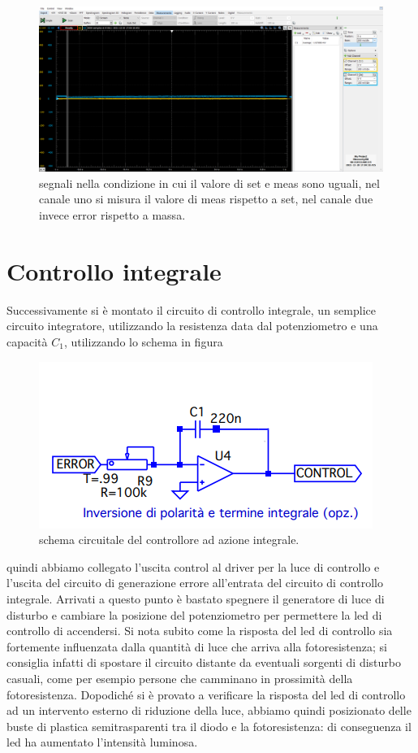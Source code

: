 \documentclass[10pt, a4paper, italian]{article}
\begin{document}
\begin{figure}[H]
    \centering
	\includegraphics[scale=0.7]{meas.same.set}
    \caption{segnali nella condizione in cui il valore di set e meas sono uguali, nel canale uno si misura il valore di meas rispetto a set, nel canale due invece error rispetto a massa.
    \label{fig: Draft1}}
\end{figure}
\section{Controllo integrale}
Successivamente si è montato il circuito di controllo integrale, un semplice circuito integratore, utilizzando la resistenza data dal potenziometro e una capacità $C_1$, utilizzando lo schema in figura
\begin{figure}[H]
    \centering
	\includegraphics[scale=0.7]{controlgenint}
    \caption{schema circuitale del controllore ad azione integrale.
    \label{fig: Draft1}}
\end{figure}
quindi abbiamo collegato l'uscita control al driver per la luce di controllo e l'uscita del circuito di generazione errore all'entrata del circuito di controllo integrale.
Arrivati a questo punto è bastato spegnere il generatore di luce di disturbo e cambiare la posizione del potenziometro per permettere la led di controllo di accendersi.
Si nota subito come la risposta del led di controllo sia fortemente influenzata dalla quantità di luce che arriva alla fotoresistenza; si consiglia infatti di spostare il circuito distante da eventuali sorgenti di disturbo casuali, come per esempio persone che camminano in prossimità della fotoresistenza. 
Dopodiché si è provato a verificare la risposta del led di controllo ad un intervento esterno di riduzione della luce, abbiamo quindi posizionato delle buste di plastica semitrasparenti tra il diodo e la fotoresistenza: di conseguenza il led ha aumentato l'intensità luminosa.
\end{document}
